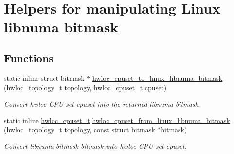 \hypertarget{group__hwlocality__linux__libnuma__bitmask}{
\section{Helpers for manipulating Linux libnuma bitmask}
\label{group__hwlocality__linux__libnuma__bitmask}
}
\subsection*{Functions}
\begin{DoxyCompactItemize}
\item 
static inline struct bitmask $\ast$ \hyperlink{group__hwlocality__linux__libnuma__bitmask_ga66720508d673173aea250095be22822d}{hwloc\_\-cpuset\_\-to\_\-linux\_\-libnuma\_\-bitmask} (\hyperlink{group__hwlocality__topology_ga9d1e76ee15a7dee158b786c30b6a6e38}{hwloc\_\-topology\_\-t} topology, \hyperlink{group__hwlocality__cpuset_ga7366332f7090f5b54d4b25a0c2c4b411}{hwloc\_\-cpuset\_\-t} cpuset)
\begin{DoxyCompactList}\small\item\em Convert hwloc CPU set {\ttfamily cpuset} into the returned libnuma bitmask. \item\end{DoxyCompactList}\item 
static inline \hyperlink{group__hwlocality__cpuset_ga7366332f7090f5b54d4b25a0c2c4b411}{hwloc\_\-cpuset\_\-t} \hyperlink{group__hwlocality__linux__libnuma__bitmask_gaa7ac171ac41f209bfbc710ca690affe0}{hwloc\_\-cpuset\_\-from\_\-linux\_\-libnuma\_\-bitmask} (\hyperlink{group__hwlocality__topology_ga9d1e76ee15a7dee158b786c30b6a6e38}{hwloc\_\-topology\_\-t} topology, const struct bitmask $\ast$bitmask)
\begin{DoxyCompactList}\small\item\em Convert libnuma bitmask {\ttfamily bitmask} into hwloc CPU set {\ttfamily cpuset}. \item\end{DoxyCompactList}\end{DoxyCompactItemize}


